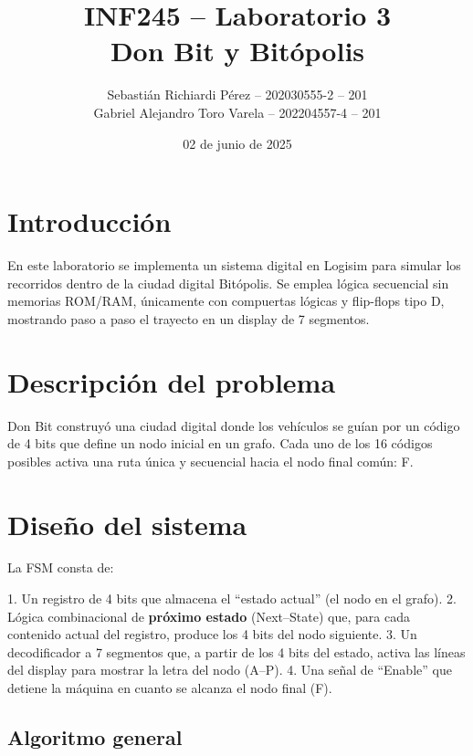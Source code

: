 \documentclass[12pt]{article}
\title{\textbf{INF245 – Laboratorio 3} \\ Don Bit y Bitópolis}
\author{
    Sebastián Richiardi Pérez – 202030555-2 – 201\\
    Gabriel Alejandro Toro Varela – 202204557-4 – 201
}
\date{02 de junio de 2025}
\begin{document}
\maketitle

\section{Introducción}
En este laboratorio se implementa un sistema digital en Logisim para simular los recorridos dentro de la ciudad digital Bitópolis. Se emplea lógica secuencial sin memorias ROM/RAM, únicamente con compuertas lógicas y flip-flops tipo D, mostrando paso a paso el trayecto en un display de 7 segmentos.

\section{Descripción del problema}
Don Bit construyó una ciudad digital donde los vehículos se guían por un código de 4 bits que define un nodo inicial en un grafo. Cada uno de los 16 códigos posibles activa una ruta única y secuencial hacia el nodo final común: F.

\section{Diseño del sistema}

La FSM consta de:

1. Un registro de 4 bits que almacena el “estado actual” (el nodo en el grafo).  
2. Lógica combinacional de \textbf{próximo estado} (Next–State) que, para cada contenido actual del registro, produce los 4 bits del nodo siguiente.  
3. Un decodificador a 7 segmentos que, a partir de los 4 bits del estado, activa las líneas del display para mostrar la letra del nodo (A–P).  
4. Una señal de “Enable” que detiene la máquina en cuanto se alcanza el nodo final (F).

\subsection{Algoritmo general}
\end{document}
